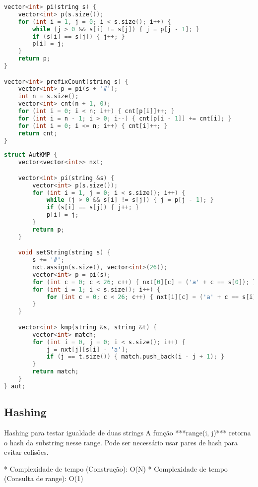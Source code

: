 \documentclass[11pt, a4paper, twoside]{article}
\begin{document}
\begin{lstlisting}[language=C++]
vector<int> pi(string s) {
    vector<int> p(s.size());
    for (int i = 1, j = 0; i < s.size(); i++) {
        while (j > 0 && s[i] != s[j]) { j = p[j - 1]; }
        if (s[i] == s[j]) { j++; }
        p[i] = j;
    }
    return p;
}

vector<int> prefixCount(string s) {
    vector<int> p = pi(s + '#');
    int n = s.size();
    vector<int> cnt(n + 1, 0);
    for (int i = 0; i < n; i++) { cnt[p[i]]++; }
    for (int i = n - 1; i > 0; i--) { cnt[p[i - 1]] += cnt[i]; }
    for (int i = 0; i <= n; i++) { cnt[i]++; }
    return cnt;
}\end{lstlisting}

\begin{lstlisting}[language=C++]
struct AutKMP {
    vector<vector<int>> nxt;

    vector<int> pi(string &s) {
        vector<int> p(s.size());
        for (int i = 1, j = 0; i < s.size(); i++) {
            while (j > 0 && s[i] != s[j]) { j = p[j - 1]; }
            if (s[i] == s[j]) { j++; }
            p[i] = j;
        }
        return p;
    }

    void setString(string s) {
        s += '#';
        nxt.assign(s.size(), vector<int>(26));
        vector<int> p = pi(s);
        for (int c = 0; c < 26; c++) { nxt[0][c] = ('a' + c == s[0]); }
        for (int i = 1; i < s.size(); i++) {
            for (int c = 0; c < 26; c++) { nxt[i][c] = ('a' + c == s[i]) ? i + 1 : nxt[p[i - 1]][c]; }
        }
    }

    vector<int> kmp(string &s, string &t) {
        vector<int> match;
        for (int i = 0, j = 0; i < s.size(); i++) {
            j = nxt[j][s[i] - 'a'];
            if (j == t.size()) { match.push_back(i - j + 1); }
        }
        return match;
    }
} aut;
\end{lstlisting}

\subsection{Hashing}



Hashing para testar igualdade de duas strings   
A função ***range(i, j)*** retorna o hash da substring nesse range.   
Pode ser necessário usar pares de hash para evitar colisões.

* Complexidade de tempo (Construção): O(N)
* Complexidade de tempo (Consulta de range): O(1)
\end{document}
